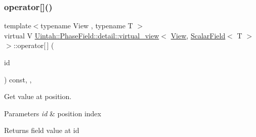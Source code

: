 \subsubsection{\texorpdfstring{operator[]()}{operator[]()}\hspace{0.1cm}{\footnotesize\ttfamily [2/2]}}
{\footnotesize\ttfamily template$<$typename View , typename T $>$ \\
virtual V \hyperlink{classUintah_1_1PhaseField_1_1detail_1_1virtual__view}{Uintah\+::\+Phase\+Field\+::detail\+::virtual\+\_\+view}$<$ \hyperlink{namespaceUintah_1_1PhaseField_a59210a1e28eba254d428762c92ddeabb}{View}, \hyperlink{structUintah_1_1PhaseField_1_1ScalarField}{Scalar\+Field}$<$ T $>$ $>$\+::operator\mbox{[}$\,$\mbox{]} (\begin{DoxyParamCaption}\item[{const Int\+Vector \&}]{id }\end{DoxyParamCaption}) const\hspace{0.3cm}{\ttfamily [inline]}, {\ttfamily [override]}, {\ttfamily [virtual]}}



Get value at position. 


\begin{DoxyParams}{Parameters}
{\em id} & position index \\
\hline
\end{DoxyParams}
\begin{DoxyReturn}{Returns}
field value at id 
\end{DoxyReturn}
\mbox{\label{classUintah_1_1PhaseField_1_1detail_1_1virtual__view_3_01View_00_01ScalarField_3_01T_01_4_01_4_af43741ba7c056b90119a666433d230c9}} 
